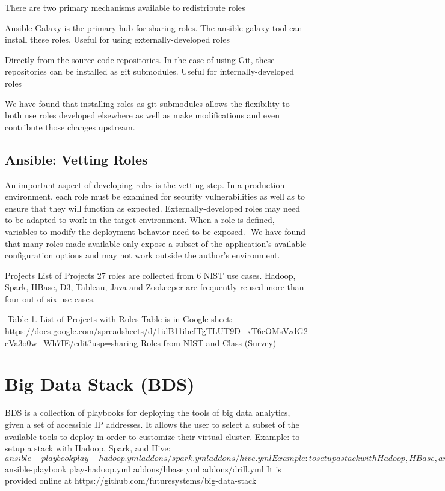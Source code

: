 There are two primary mechanisms available to redistribute roles

Ansible Galaxy is the primary hub for sharing roles. The
ansible-galaxy tool can install these roles. Useful for using
externally-developed roles

Directly from the source code repositories. In the case of using Git,
these repositories can be installed as git submodules. Useful for
internally-developed roles

We have found that installing roles as git submodules allows the
flexibility to both use roles developed elsewhere as well as make
modifications and even contribute those changes upstream.

\subsection{Ansible: Vetting Roles}
An important aspect of developing roles is the vetting step.
In a production environment, each role must be 
examined for security vulnerabilities as well as to 
ensure that they will function as expected. 
Externally-developed roles may need to be adapted to work in the target environment. When a role is defined, variables to modify the deployment behavior need to be exposed.  We have found that many roles made available only expose a subset of the application's available configuration options and may not work outside the author's environment.

Projects
List of Projects
27 roles are collected from 6 NIST use cases. Hadoop, Spark, HBase, D3, Tableau, Java and Zookeeper are frequently reused more than four out of six use cases.





 Table 1. List of Projects with Roles
Table is in Google sheet: \url{https://docs.google.com/spreadsheets/d/1idB11ibeITgTLUT9D_xT6cOMsVzdG2cVa3o0w_Wh7IE/edit?usp=sharing}
Roles from NIST and Class (Survey)


\section{Big Data Stack (BDS)}
BDS is a collection of playbooks for deploying the tools of big data analytics, given a set of accessible IP addresses. It allows the user to select a subset of the available tools to deploy in order to customize their virtual cluster.
Example: to setup a stack with Hadoop, Spark, and Hive:
$ ansible-playbook play-hadoop.yml addons/spark.yml addons/hive.yml
Example: to setup a stack with Hadoop, HBase, and Drill:
$ ansible-playbook play-hadoop.yml addons/hbase.yml addons/drill.yml
It is provided online at https://github.com/futuresystems/big-data-stack

